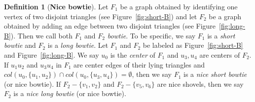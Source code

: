 \documentclass[10pt,a4paper]{article}
\theoremstyle{definition}
\newtheorem{definition}{Definition}
\begin{document}
\begin{definition}[\textbf{Nice bowtie}]
Let $F_1$ be a graph obtained by identifying one vertex of two disjoint triangles (see Figure~\ref{fig:short-B}) and let  $F_2$ be a graph obtained by adding an edge between two disjoint triangles (see Figure~\ref{fig:long-B}). Then we call both $F_1$ and $F_2$ \textit{bowtie}. To be specific, we say $F_1$ is a \textit{short bowtie} and $F_2$ is a \textit{long bowtie}. Let $F_1$ and $F_2$ be labeled as Figure~\ref{fig:short-B} and Figure~\ref{fig:long-B}. We say $u_0$ is the \textit{center} of $F_1$ and $u_3, u_4$ are centers of $F_2$. If $u_1u_2$ and $u_3u_4$ in $F_1$ are center edges of their lying triangles  and $col(u_0, \{u_1,u_2\})\cap col(u_0, \{u_3,u_4\})=\emptyset$, then we say $F_1$ is a \textit{nice short bowtie} (or nice bowtie).  If $F_2-\{v_1,v_2\}$ and $F_2-\{v_5,v_6\}$ are nice shovels, then we say $F_2$ is a \textit{nice long bowtie} (or nice bowtie).
\end{definition}
\end{document}
